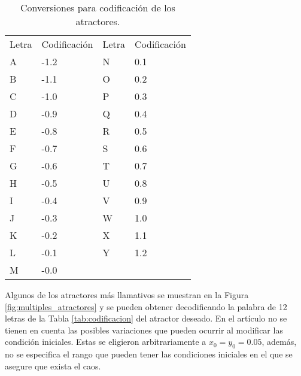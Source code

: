         \begin{table}[htbp]
            \centering
            \caption{Conversiones para codificación de los atractores.}
            \begin{tabular}{|l|l|l|l|}
                \hline
                \rowcolor{lightgray}   Letra & Codificación & Letra & Codificación\\
                A & -1.2 & N & 0.1 \\ 
                \hline
                B & -1.1 & O & 0.2 \\ 
                \hline
                C & -1.0 & P & 0.3 \\ 
                \hline
                D & -0.9 & Q & 0.4 \\ 
                \hline
                E & -0.8 & R & 0.5 \\ 
                \hline
                F & -0.7 & S & 0.6 \\ 
                \hline
                G & -0.6 & T & 0.7 \\ 
                \hline
                H & -0.5 & U & 0.8 \\ 
                \hline
                I & -0.4 & V & 0.9 \\ 
                \hline
                J & -0.3 & W & 1.0 \\ 
                \hline
                K & -0.2 & X & 1.1 \\ 
                \hline
                L & -0.1 & Y & 1.2 \\ 
                \hline
                M & -0.0 &   &     \\ 
                \hline
            \end{tabular}
            \label{tab:conversion_mapas}
        \end{table}

        Algunos de los atractores más llamativos se muestran en la Figura \ref{fig:multiples_atractores} y se pueden obtener decodificando la palabra de 12 letras de la Tabla \ref{tab:codificacion} del atractor deseado. En el artículo \cite{Sprott1993} no se tienen en cuenta las posibles variaciones que pueden ocurrir al modificar las condición iniciales. Estas se eligieron arbitrariamente a $x_{0} = y_{0} = 0.05$, además, no se especifica el rango que pueden tener las condiciones iniciales en el que se asegure que exista el caos.

